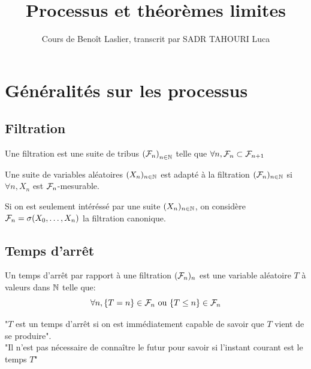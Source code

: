 \documentclass[]{report}
\title{Processus et théorèmes limites}
\author{Cours de Benoît Laslier, transcrit par SADR TAHOURI Luca}
\date{}
\begin{document}
    \maketitle
    \tableofcontents

    \chapter{Généralités sur les processus}

    \section{Filtration}

    \begin{df}{}{}
        Une filtration est une suite de tribus $\left( \mathcal{F}_n\right)_{n\in\mathbb{N}}$ telle que $\forall n, \mathcal{F}_n \subset \mathcal{F}_{n+1}$
    \end{df}

    \begin{df}{}{}
        Une suite de variables aléatoires $(X_n)_{n\in\mathbb{N}}$ est adapté à la filtration $(\mathcal{F}_n)_{n\in\mathbb{N}}$ si $\forall n,X_n$ est $\mathcal{F}_n$-mesurable.
    \end{df}

    \begin{ex}{}{}
        Si on est seulement intéréssé par une suite $(X_n)_{n\in\mathbb{N}}$, on considère $\mathcal{F}_n=\sigma(X_0,\ldots,X_n)$ la filtration canonique.
    \end{ex}

    \section{Temps d'arrêt}

    \begin{df}{}{}
        Un temps d'arrêt par rapport à une filtration $(\mathcal{F}_n)_n$ est une variable aléatoire $T$ à valeurs dans $\mathbb{N}$ telle que:
        \[\forall n, \{T=n\}\in \mathcal{F}_n\text{ ou } \{T\le n\}\in \mathcal{F}_n\]
    \end{df}

    \begin{re}{}{}
        "$T$ est un temps d'arrêt si on est immédiatement capable de savoir que $T$ vient de se produire".\\
        "Il n'est pas nécessaire de connaître le futur pour savoir si l'instant courant est le temps $T$"
    \end{re}
\end{document}
